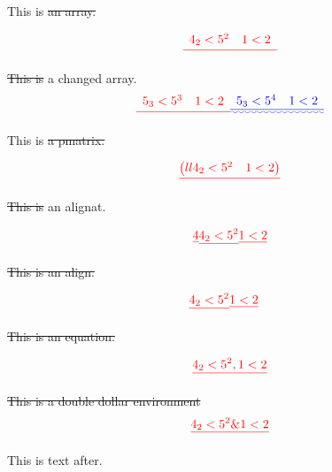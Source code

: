\documentclass{article}
\providecommand{\DIFadd}[1]{{\protect\color{blue}\uwave{#1}}} %
\providecommand{\DIFdel}[1]{{\protect\color{red}\sout{#1}}}                      %
\providecommand{\DIFaddbegin}{} %
\providecommand{\DIFaddend}{} %
\providecommand{\DIFdelbegin}{} %
\providecommand{\DIFdelend}{} %
\begin{document}
This is \DIFdelbegin \DIFdel{an array.
}%

\[\DIFdel{
\begin{array}{ll}
 4_2  < 5^2 & 1 < 2 \\
\end{array}
}\]

\DIFdel{This is }\DIFdelend a changed array.
\[\DIFdelbegin \DIFdel{
\begin{array}{ll}
 5_3  < 5^3 & 1 < 2 \\
\end{array}
}\DIFdelend \DIFaddbegin \DIFadd{
\begin{array}{ll}
 5_3  < 5^4 & 1 < 2 \\\hline
\end{array}
}\DIFaddend \]

This is \DIFdelbegin \DIFdel{a pmatrix.
}%

\[\DIFdel{
\begin{pmatrix}{ll}
 4_2  < 5^2 & 1 < 2 \\
\end{pmatrix}
}\]

\DIFdel{This is }\DIFdelend an alignat.
\DIFdelbegin %

\begin{align*}{\DIFdel{4}}
 \DIFdel{4_2  < 5^2 }& \DIFdel{1 < 2 }\\
\end{align*}

\DIFdel{This is an align.
}%

\begin{align*}\DIFdel{
 4_2  < 5^2 }& \DIFdel{1 < 2 
}\end{align*}

\DIFdel{This is an equation.
}%

\begin{displaymath}\DIFdel{
 4_2  < 5^2 , 1 < 2 }\\
\end{displaymath}

\DIFdel{This is a double dollar environment
}\begin{displaymath}\DIFdel{
 4_2  < 5^2 \& 1 < 2 
}\end{displaymath}
\DIFdelend 

This is text after.
\end{document}
